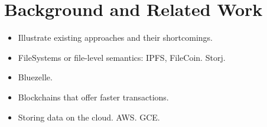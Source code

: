 
\section{Background and Related Work}
    \begin{itemize}
        \item Illustrate existing approaches and their shortcomings.
        \item FileSystems or file-level semantics: IPFS, FileCoin. Storj.
        \item Bluezelle.
        \item Blockchains that offer faster transactions.
        \item Storing data on the cloud. AWS. GCE.
    \end{itemize}


